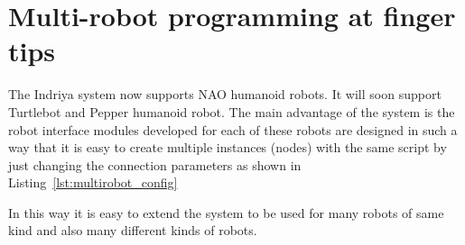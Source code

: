 
\section{Multi-robot programming at finger tips}
The Indriya system now supports NAO humanoid robots. It will soon support Turtlebot and Pepper humanoid robot. The main advantage of the system is the robot interface modules developed for each of these robots are designed in such a way that it is easy to create multiple instances (nodes) with the same script by just changing the connection parameters as shown in Listing~\ref{lst:multirobot_config}

In this way it is easy to extend the system to be used for many robots of same kind and also many different kinds of robots. 
